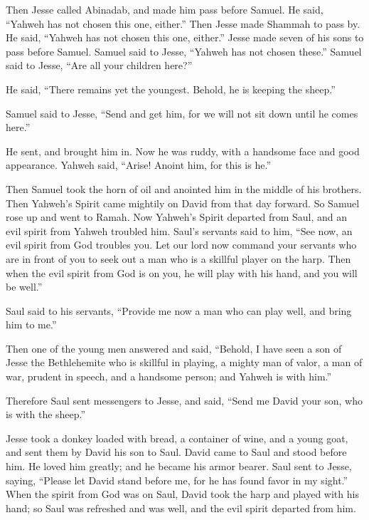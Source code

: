  Then Jesse called Abinadab, and made him pass before
Samuel. He said, ``Yahweh has not chosen this one, either.''
 Then Jesse made Shammah to pass by. He said, ``Yahweh has
not chosen this one, either.''  Jesse made seven of his
sons to pass before Samuel. Samuel said to Jesse, ``Yahweh has not
chosen these.''  Samuel said to Jesse, ``Are all your
children here?''

He said, ``There remains yet the youngest. Behold, he is keeping the
sheep.''

Samuel said to Jesse, ``Send and get him, for we will not sit down until
he comes here.''

 He sent, and brought him in. Now he was ruddy, with a
handsome face and good appearance. Yahweh said, ``Arise! Anoint him, for
this is he.''

 Then Samuel took the horn of oil and anointed him in the
middle of his brothers. Then Yahweh's Spirit came mightily on David from
that day forward. So Samuel rose up and went to Ramah.  Now
Yahweh's Spirit departed from Saul, and an evil spirit from Yahweh
troubled him.  Saul's servants said to him, ``See now, an
evil spirit from God troubles you.  Let our lord now
command your servants who are in front of you to seek out a man who is a
skillful player on the harp. Then when the evil spirit from God is on
you, he will play with his hand, and you will be well.''

 Saul said to his servants, ``Provide me now a man who can
play well, and bring him to me.''

 Then one of the young men answered and said, ``Behold, I
have seen a son of Jesse the Bethlehemite who is skillful in playing, a
mighty man of valor, a man of war, prudent in speech, and a handsome
person; and Yahweh is with him.''

 Therefore Saul sent messengers to Jesse, and said, ``Send
me David your son, who is with the sheep.''

 Jesse took a donkey loaded with bread, a container of
wine, and a young goat, and sent them by David his son to Saul.
 David came to Saul and stood before him. He loved him
greatly; and he became his armor bearer.  Saul sent to
Jesse, saying, ``Please let David stand before me, for he has found
favor in my sight.''  When the spirit from God was on Saul,
David took the harp and played with his hand; so Saul was refreshed and
was well, and the evil spirit departed from him.

